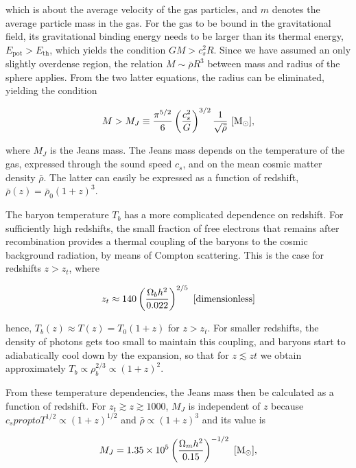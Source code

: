 \documentclass[a4paper,11pt]{article}
\begin{document}
{\noindent}which is about the average velocity of the gas particles, and $m$ denotes the average particle mass in the gas. For the gas to be bound in the gravitational field, its gravitational binding energy needs to be larger than its thermal energy, $E_\mathrm{pot}>E_\mathrm{th}$, which yields the condition $GM>c_s^2R$. Since we have assumed an only slightly overdense region, the relation $M\sim\bar{\rho}R^3$ between mass and radius of the sphere applies. From the two latter equations, the radius can be eliminated, yielding the condition

\begin{align*}
    M > M_J \equiv \frac{\pi^{5/2}}{6}\left(\frac{c_s^2}{G}\right)^{3/2}\frac{1}{\sqrt{\bar{\rho}}} ~ [{\rm M_\odot}],
\end{align*}

{\noindent}where $M_J$ is the Jeans mass. The Jeans mass depends on the temperature of the gas, expressed through the sound speed $c_s$, and on the mean cosmic matter density $\bar{\rho}$. The latter can easily be expressed as a function of redshift, $\bar{\rho}(z) = \bar{\rho}_0(1+z)^3$.

{\noindent}The baryon temperature $T_b$ has a more complicated dependence on redshift. For sufficiently high redshifts, the small fraction of free electrons that remains after recombination provides a thermal coupling of the baryons to the cosmic background radiation, by means of Compton scattering. This is the case for redshifts $z>z_t$, where

\begin{align*}
    z_t \approx 140\left(\frac{\Omega_bh^2}{0.022}\right)^{2/5} ~ [{\rm dimensionless}]
\end{align*}

{\noindent}hence, $T_b(z)\approx T(z)=T_0(1+z)$ for $z>z_t$. For smaller redshifts, the density of photons gets too small to maintain this coupling, and baryons start to adiabatically cool down by the expansion, so that for $z\lesssim zt$ we obtain approximately $T_b\propto\rho_b^{2/3}\propto(1+z)^2$.

{\noindent}From these temperature dependencies, the Jeans mass then be calculated as a function of redshift. For $z_t\gtrsim z\gtrsim 1000$, $M_J$ is independent of $z$ because $c_s
propto T^{1/2}\propto(1+z)^{1/2}$ and $\bar{\rho}\propto(1+z)^3$ and its value is

\begin{align*}
    M_J = 1.35\times10^5 \left(\frac{\Omega_mh^2}{0.15}\right)^{-1/2} ~ [{\rm M_\odot}],
\end{align*}
\end{document}
